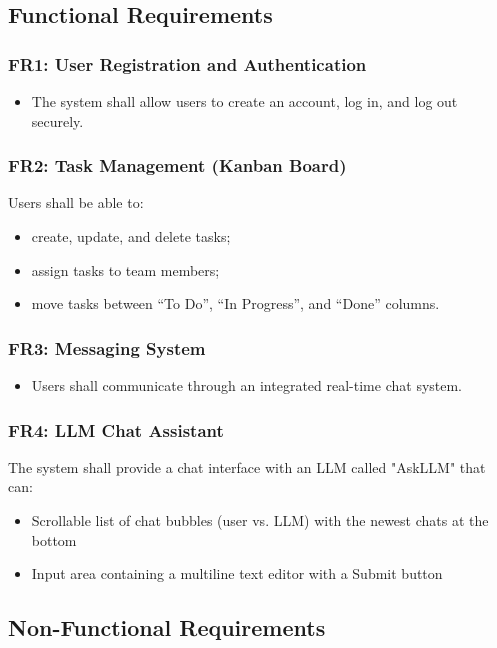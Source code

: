 \documentclass[11pt]{article}
\begin{document}
\subsection{Functional Requirements}

\subsubsection{FR1: User Registration and Authentication}
\begin{itemize}
    \item The system shall allow users to create an account, log in, and log out securely.
\end{itemize}

\subsubsection{FR2: Task Management (Kanban Board)}
    Users shall be able to:
\begin{itemize}

  \item create, update, and delete tasks;
  \item assign tasks to team members;
  \item move tasks between “To Do”, “In Progress”, and “Done” columns.
\end{itemize}

\subsubsection{FR3: Messaging System}
\begin{itemize}
    \item Users shall communicate through an integrated real-time chat system.
\end{itemize}

\subsubsection{FR4: LLM Chat Assistant}
The system shall provide a chat interface with an LLM called "AskLLM" that can:
\begin{itemize}
        \item Scrollable list of chat bubbles (user vs. LLM) with the newest chats at the bottom
        \item Input area containing a multiline text editor with a Submit button
\end{itemize}


\subsection{Non-Functional Requirements}
\end{document}
